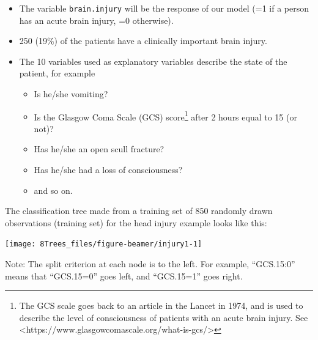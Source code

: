 \documentclass[10pt,ignorenonframetext,]{beamer}
\providecommand{\tightlist}{%
  \setlength{\itemsep}{0pt}\setlength{\parskip}{0pt}}
\begin{document}
\begin{frame}[fragile]

\begin{itemize}
\tightlist
\item
  The variable \texttt{brain.injury} will be the response of our model
  (=1 if a person has an acute brain injury, =0 otherwise).
\end{itemize}

\vspace{0mm}

\begin{itemize}
\tightlist
\item
  250 (19\%) of the patients have a clinically important brain injury.
\end{itemize}

\vspace{0mm}

\begin{itemize}
\item
  The 10 variables used as explanatory variables describe the state of
  the patient, for example

  \begin{itemize}
  \tightlist
  \item
    Is he/she vomiting?
  \item
    Is the Glasgow Coma Scale (GCS)
    score\footnote{The GCS scale goes back to an article in the Lancet in 1974, and is used to describe the level of consciousness of patients with an acute brain injury. See <https://www.glasgowcomascale.org/what-is-gcs/>}
    after 2 hours equal to 15 (or not)?
  \item
    Has he/she an open scull fracture?
  \item
    Has he/she had a loss of consciousness?
  \item
    and so on.
  \end{itemize}
\end{itemize}

\end{frame}

\begin{frame}

The classification tree made from a training set of 850 randomly drawn
observations (training set) for the head injury example looks like this:

\begin{center}\texttt{[image: 8Trees\_files/figure-beamer/injury1-1]} \end{center}

\small
Note: The split criterion at each node is to the left. For example,
``GCS.15:0'' means that ``GCS.15=0'' goes left, and ``GCS.15=1'' goes
right.

\end{frame}
\end{document}
